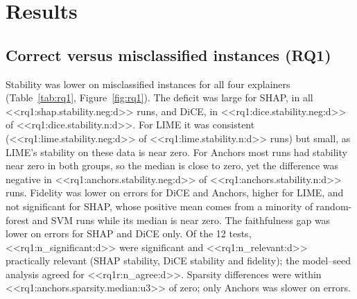 \documentclass[12pt,letterpaper]{article}
\begin{document}
\section{Results}

\subsection{Correct versus misclassified instances (RQ1)}

Stability was lower on misclassified instances for all four explainers
(Table~\ref{tab:rq1}, Figure~\ref{fig:rq1}). The deficit was large for SHAP, in all
<<rq1:shap.stability.neg:d>> runs, and DiCE, in <<rq1:dice.stability.neg:d>> of
<<rq1:dice.stability.n:d>>. For LIME it was consistent (<<rq1:lime.stability.neg:d>> of
<<rq1:lime.stability.n:d>> runs) but small, as LIME's stability on these data is near zero.
For Anchors most runs had stability near zero in both groups, so the median is close to
zero, yet the difference was negative in <<rq1:anchors.stability.neg:d>> of
<<rq1:anchors.stability.n:d>> runs. Fidelity was lower on errors for DiCE and Anchors,
higher for LIME, and not significant for SHAP, whose positive mean comes from a minority of
random-forest and SVM runs while its median is near zero. The faithfulness gap was lower on
errors for SHAP and DiCE only. Of the 12 tests, <<rq1:n_significant:d>> were significant and
<<rq1:n_relevant:d>> practically relevant (SHAP stability, DiCE stability and fidelity); the
model--seed analysis agreed for <<rq1r:n_agree:d>>. Sparsity differences were within
<<rq1:anchors.sparsity.median:u3>> of zero; only Anchors was slower on errors.
\end{document}
